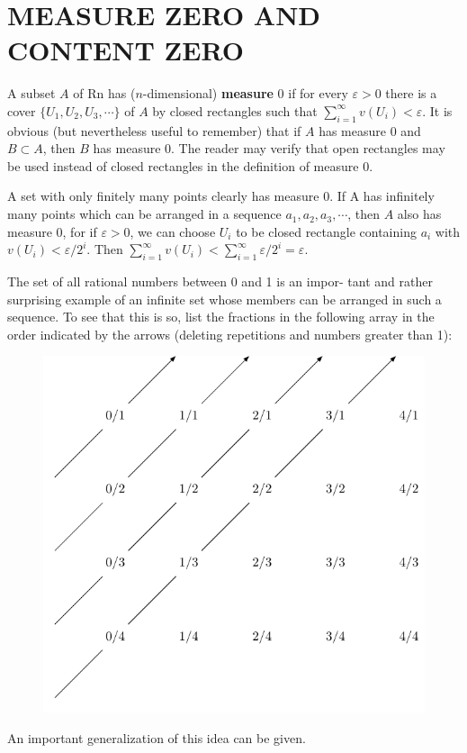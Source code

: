 \section{MEASURE ZERO AND CONTENT ZERO}
A subset $A$ of Rn has ($n$-dimensional) \textbf{measure} 0 if for every
$\varepsilon > 0$ there is a cover $\{U_1, U_2, U_3, \cdots \}$ of $A$ by 
closed rectangles such that $\sum_{i=1}^{\infty}{v(U_i)}< \varepsilon$.
It is obvious (but nevertheless useful to remember) that if $A$ has measure 0 and
$B \subset A$, then $B$ has measure 0.
The reader may verify that open rectangles may be used instead of closed rectangles in
the definition of measure 0.

A set with only finitely many points clearly has measure 0.
If A has infinitely many points which can be arranged in a
sequence $a_1, a_2, a_3,\cdots$, then $A$ also has measure 0, 
for if $\varepsilon>0$, we can choose $U_i$ to be closed rectangle
containing $a_i$ with $v(U_i)< \varepsilon/2^i$. Then 
$\sum_{i=1 }^{\infty}{v(U_i)} < \sum_{i=1 }^{\infty}{\varepsilon/2^i} = \varepsilon$.

The set of all rational numbers between 0 and 1 is an impor-
tant and rather surprising example of an infinite set whose
members can be arranged in such a sequence.
To see that this is so, list the fractions in the following array in the order
indicated by the arrows (deleting repetitions and numbers
greater than 1):

\begin{figure}[H]
    \centering
    \includegraphics[width=.65\linewidth]{./pics/Fig3-(1).pdf}
\end{figure}

An important generalization of this idea can be given.

